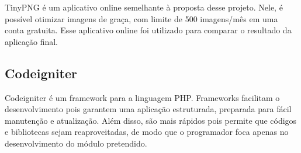 TinyPNG é um aplicativo online semelhante à proposta desse projeto. Nele, é possível otimizar imagens de graça, com limite de 500 imagens/mês em uma conta gratuita. Esse aplicativo online foi utilizado para comparar o resultado da aplicação final.

\subsection{Codeigniter}
\label{s.ci}

Codeigniter é um framework para a linguagem PHP. Frameworks facilitam o desenvolvimento pois garantem uma aplicação estruturada, preparada para fácil manutenção e atualização. Além disso, são mais rápidos pois permite que códigos e bibliotecas sejam reaproveitadas, de modo que o programador foca apenas no desenvolvimento do módulo pretendido.
